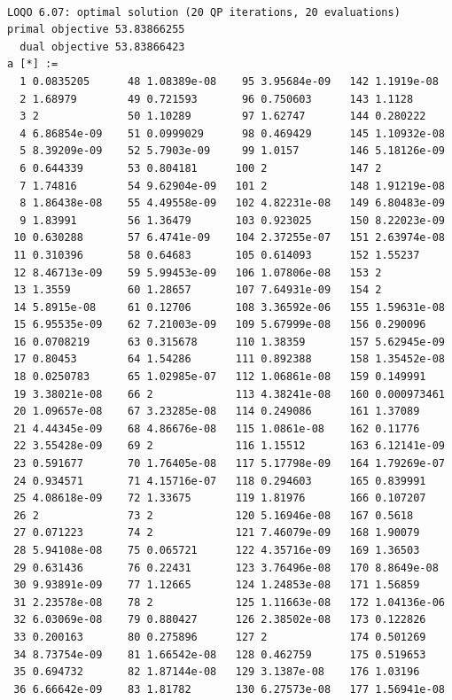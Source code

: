 \documentclass{article}
\begin{document}
\begin{verbatim}

LOQO 6.07: optimal solution (20 QP iterations, 20 evaluations)
primal objective 53.83866255
  dual objective 53.83866423
a [*] :=
  1 0.0835205      48 1.08389e-08    95 3.95684e-09   142 1.1919e-08
  2 1.68979        49 0.721593       96 0.750603      143 1.1128
  3 2              50 1.10289        97 1.62747       144 0.280222
  4 6.86854e-09    51 0.0999029      98 0.469429      145 1.10932e-08
  5 8.39209e-09    52 5.7903e-09     99 1.0157        146 5.18126e-09
  6 0.644339       53 0.804181      100 2             147 2
  7 1.74816        54 9.62904e-09   101 2             148 1.91219e-08
  8 1.86438e-08    55 4.49558e-09   102 4.82231e-08   149 6.80483e-09
  9 1.83991        56 1.36479       103 0.923025      150 8.22023e-09
 10 0.630288       57 6.4741e-09    104 2.37255e-07   151 2.63974e-08
 11 0.310396       58 0.64683       105 0.614093      152 1.55237
 12 8.46713e-09    59 5.99453e-09   106 1.07806e-08   153 2
 13 1.3559         60 1.28657       107 7.64931e-09   154 2
 14 5.8915e-08     61 0.12706       108 3.36592e-06   155 1.59631e-08
 15 6.95535e-09    62 7.21003e-09   109 5.67999e-08   156 0.290096
 16 0.0708219      63 0.315678      110 1.38359       157 5.62945e-09
 17 0.80453        64 1.54286       111 0.892388      158 1.35452e-08
 18 0.0250783      65 1.02985e-07   112 1.06861e-08   159 0.149991
 19 3.38021e-08    66 2             113 4.38241e-08   160 0.000973461
 20 1.09657e-08    67 3.23285e-08   114 0.249086      161 1.37089
 21 4.44345e-09    68 4.86676e-08   115 1.0861e-08    162 0.11776
 22 3.55428e-09    69 2             116 1.15512       163 6.12141e-09
 23 0.591677       70 1.76405e-08   117 5.17798e-09   164 1.79269e-07
 24 0.934571       71 4.15716e-07   118 0.294603      165 0.839991
 25 4.08618e-09    72 1.33675       119 1.81976       166 0.107207
 26 2              73 2             120 5.16946e-08   167 0.5618
 27 0.071223       74 2             121 7.46079e-09   168 1.90079
 28 5.94108e-08    75 0.065721      122 4.35716e-09   169 1.36503
 29 0.631436       76 0.22431       123 3.76496e-08   170 8.8649e-08
 30 9.93891e-09    77 1.12665       124 1.24853e-08   171 1.56859
 31 2.23578e-08    78 2             125 1.11663e-08   172 1.04136e-06
 32 6.03069e-08    79 0.880427      126 2.38502e-08   173 0.122826
 33 0.200163       80 0.275896      127 2             174 0.501269
 34 8.73754e-09    81 1.66542e-08   128 0.462759      175 0.519653
 35 0.694732       82 1.87144e-08   129 3.1387e-08    176 1.03196
 36 6.66642e-09    83 1.81782       130 6.27573e-08   177 1.56941e-08

\end{verbatim}
\end{document}
